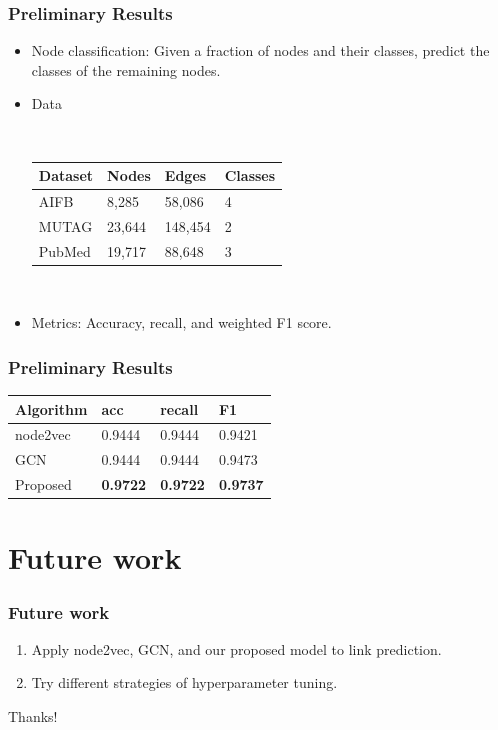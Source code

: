 \documentclass[notes, 10pt, aspectratio=169]{beamer}
\begin{document}
\begin{frame}
    \frametitle{Preliminary Results}
    \begin{itemize}
        \item Node classification: Given a fraction of nodes and their classes, predict the classes of the remaining nodes.
        \item Data\par~\\
            \begin{tabular}{llll}
                \toprule
                \textbf{Dataset} & \textbf{Nodes} & \textbf{Edges} & \textbf{Classes}\\
                \midrule
                AIFB & 8,285 & 58,086 & 4\\
                MUTAG & 23,644 & 148,454 & 2\\
                PubMed & 19,717 & 88,648 & 3\\
                \bottomrule
            \end{tabular}
            \par~\\
        \item Metrics: Accuracy, recall, and weighted F1 score.
    \end{itemize}
\end{frame}

\begin{frame}
    \frametitle{Preliminary Results}
    \begin{tabular}{llll}
        \toprule
        \textbf{Algorithm} & \textbf{acc} & \textbf{recall} & \textbf{F1}\\
        \midrule
        node2vec & 0.9444 & 0.9444 & 0.9421\\
        GCN & 0.9444 & 0.9444 & 0.9473\\
        Proposed & \textbf{0.9722} & \textbf{0.9722} & \textbf{0.9737}\\
        \bottomrule
    \end{tabular}
\end{frame}

\section{Future work}
\begin{frame}
    \frametitle{Future work} 
    \begin{enumerate}
        \item Apply node2vec, GCN, and our proposed model to link prediction.
        \item Try different strategies of hyperparameter tuning.
    \end{enumerate}
    \vspace{1.5cm}
    \begin{center}
        \LARGE Thanks!
    \end{center}
\end{frame}
\end{document}
